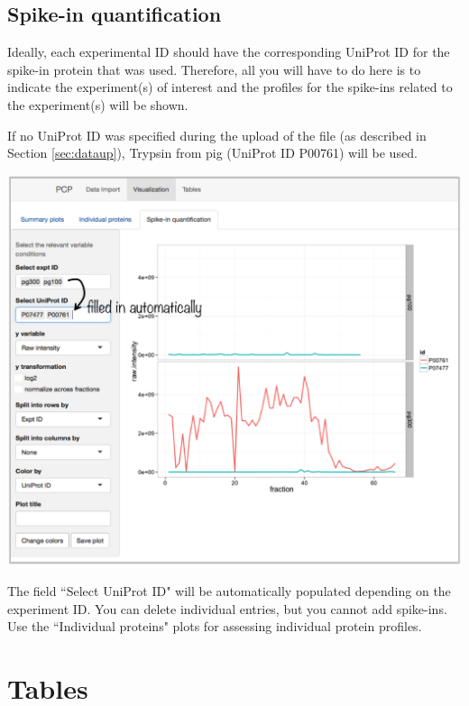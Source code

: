 \documentclass[letterpaper, twocolumn, 9pt]{article}
\begin{document}
\subsection{Spike-in quantification}

Ideally, each experimental ID should have the corresponding UniProt ID for the spike-in protein that was used.
Therefore, all you will have to do here is to indicate the experiment(s) of interest and the profiles for the spike-ins related to the experiment(s) will be shown.

If no UniProt ID was specified during the upload of the file (as described in Section \ref{sec:dataup}), Trypsin from pig (UniProt ID P00761) will be used.

\begin{center}
\includegraphics[width=.98\columnwidth]{figures/ss_spikeIn01.png}
\end{center}

The field \textsf{``Select UniProt ID"} will be automatically populated depending on the experiment ID. You can delete individual entries, but you cannot add spike-ins. Use the \textsf{``Individual proteins"} plots for assessing individual protein profiles.

\section{Tables}
\end{document}
